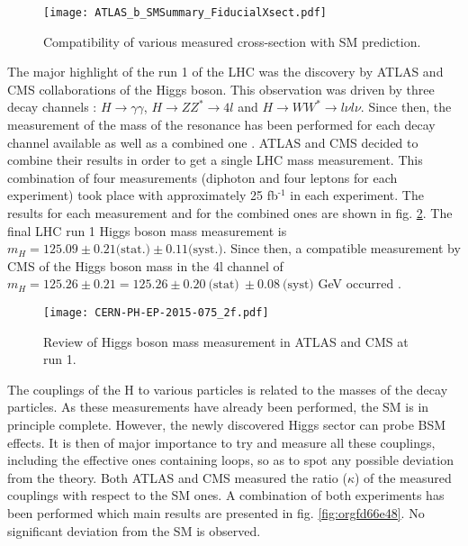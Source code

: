 \begin{figure}[htbp]
\centering
\texttt{[image: ATLAS\_b\_SMSummary\_FiducialXsect.pdf]}
\caption{\label{fig:org87b5838}
Compatibility of various measured cross-section with SM prediction. \cite{ATLASSMTest}}
\end{figure}


The major highlight of the run 1 of the LHC was the discovery by ATLAS and CMS collaborations of the Higgs boson.
This observation was driven by three decay channels : \(H\rightarrow\gamma\gamma\), \(H\rightarrow ZZ^*\rightarrow 4l\) and \(H\rightarrow WW^* \rightarrow l\nu l\nu\).
Since then, the measurement of the mass of the resonance has been performed for each decay channel available as well as a combined one \cite{CMS-HIG-14-009,CERN-PH-EP-2014-122}.
ATLAS and CMS decided to combine \cite{CERN-PH-EP-2015-075} their results in order to get a single LHC mass measurement.
This combination of four measurements (diphoton and four leptons for each experiment) took place with approximately 25 fb\(^{\text{-1}}\) in each experiment.
The results for each measurement and for the combined ones are shown in fig. \ref{fig:orga7ceb32}.
The final LHC run 1 Higgs boson mass measurement is  \(m_H = 125.09 \pm 0.21 \text{(stat.)} \pm 0.11 \text{(syst.)}\).
Since then, a compatible measurement by CMS of the Higgs boson mass in the 4l channel of \(m_H=125.26\pm0.21=125.26 \pm 0.20\ \text{(stat)}\ \pm 0.08\ \text{(syst)}\) GeV occurred \cite{CMS-PAS-HIG-16-041,CMS-HIG-16-041}.

\begin{figure}[htbp]
\centering
\texttt{[image: CERN-PH-EP-2015-075\_2f.pdf]}
\caption{\label{fig:orga7ceb32}
Review of Higgs boson mass measurement in ATLAS and CMS at run 1. \cite{CERN-PH-EP-2015-075}}
\end{figure}

The couplings of the H to various particles is related to the masses of the decay particles.
As these measurements have already been performed, the SM is in principle complete.
However, the newly discovered Higgs sector can probe BSM effects.
It is then of major importance to try and measure all these couplings, including the effective ones containing loops, so as to spot any possible deviation from the theory.
 Both ATLAS \cite{ATLAS-CONF-2015-007} and CMS \cite{CMS-HIG-14-009} measured the ratio ($\kappa$) of the measured couplings with respect to the SM ones.
A combination of both experiments \cite{CERN-EP-2016-100} has been performed which main results are presented in fig. \ref{fig:orgfd66e48}.
No significant deviation from the SM is observed.

